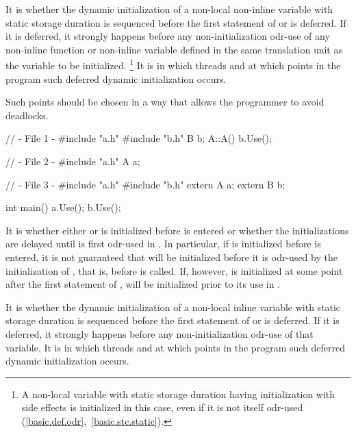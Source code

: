 \pnum
{}%
It is 
whether the dynamic initialization of a
non-local non-inline variable with static storage duration
is sequenced before the first statement of  or is deferred.
If it is deferred, it strongly happens before
any non-initialization odr-use
of any non-inline function or non-inline variable
defined in the same translation unit as the variable to be initialized.%
\footnote{A non-local variable with static storage duration
having initialization
with side effects is initialized in this case,
even if it is not itself odr-used (\ref{basic.def.odr},~\ref{basic.stc.static}).}
It is 
in which threads and at which points in the program such deferred dynamic initialization occurs.
\begin{note}
Such points should be chosen in a way that allows the programmer to avoid deadlocks.
\end{note}
\begin{example}
\begin{codeblock}
// - File 1 -
#include "a.h"
#include "b.h"
B b;
A::A(){
  b.Use();
}

// - File 2 -
#include "a.h"
A a;

// - File 3 -
#include "a.h"
#include "b.h"
extern A a;
extern B b;

int main() {
  a.Use();
  b.Use();
}
\end{codeblock}

It is 
whether either  or  is
initialized before  is entered or whether the
initializations are delayed until  is first odr-used in
. In particular, if  is initialized before
 is entered, it is not guaranteed that  will be
initialized before it is odr-used by the initialization of , that
is, before  is called. If, however,  is initialized
at some point after the first statement of ,  will
be initialized prior to its use in . \end{example}

\pnum
It is 
whether the dynamic initialization of a
non-local inline variable with static storage duration
is sequenced before the first statement of  or is deferred.
If it is deferred, it strongly happens before
any non-initialization odr-use
of that variable.
It is 
in which threads and at which points in the program such deferred dynamic initialization occurs.

